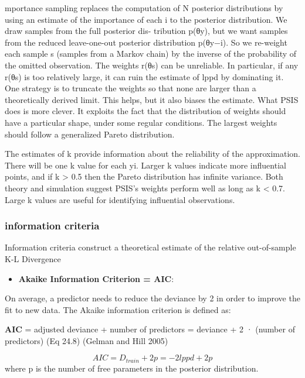 \documentclass[
]{article}
\providecommand{\tightlist}{%
  \setlength{\itemsep}{0pt}\setlength{\parskip}{0pt}}
\begin{document}
mportance sampling replaces the computation of N posterior distributions
by using an estimate of the importance of each i to the posterior
distribution. We draw samples from the full posterior dis- tribution
p(θ\textbar y), but we want samples from the reduced leave-one-out
posterior distribution p(θ\textbar y−i). So we re-weight each sample s
(samples from a Markov chain) by the inverse of the probability of the
omitted observation. The weights r(θs) can be unreliable. In particular,
if any r(θs) is too relatively large, it can ruin the estimate of lppd
by dominating it. One strategy is to truncate the weights so that none
are larger than a theoretically derived limit. This helps, but it also
biases the estimate. What PSIS does is more clever. It exploits the fact
that the distribution of weights should have a particular shape, under
some regular conditions. The largest weights should follow a generalized
Pareto distribution.

The estimates of k provide information about the reliability of the
approximation. There will be one k value for each yi. Larger k values
indicate more influential points, and if k \textgreater{} 0.5 then the
Pareto distribution has infinite variance. Both theory and simulation
suggest PSIS's weights perform well as long as k \textless{} 0.7. Large
k values are useful for identifying influential observations.

\hypertarget{information-criteria}{%
\subsubsection{information criteria}\label{information-criteria}}

Information criteria construct a theoretical estimate of the relative
out-of-sample K-L Divergence

\begin{itemize}
\tightlist
\item
  \textbf{Akaike Information Criterion = AIC}:
\end{itemize}

On average, a predictor needs to reduce the deviance by 2 in order to
improve the fit to new data. The Akaike information criterion is defined
as:

\textbf{AIC} = adjusted deviance + number of predictors = deviance + 2 ·
(number of predictors) (Eq 24.8) (Gelman and Hill 2005)

\[AIC= D_{train} + 2p = -2lppd + 2p\] where p is the number of free
parameters in the posterior distribution.
\end{document}
